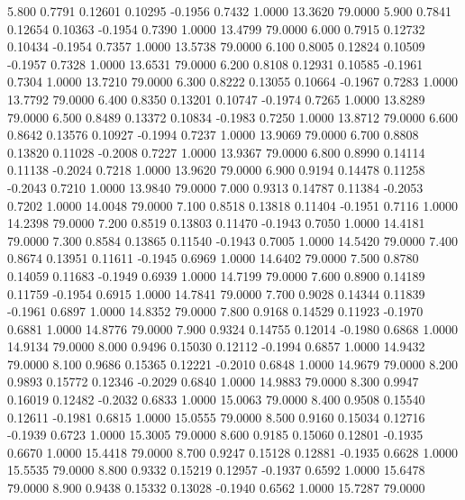    5.800   0.7791   0.12601   0.10295  -0.1956   0.7432   1.0000  13.3620  79.0000
   5.900   0.7841   0.12654   0.10363  -0.1954   0.7390   1.0000  13.4799  79.0000
   6.000   0.7915   0.12732   0.10434  -0.1954   0.7357   1.0000  13.5738  79.0000
   6.100   0.8005   0.12824   0.10509  -0.1957   0.7328   1.0000  13.6531  79.0000
   6.200   0.8108   0.12931   0.10585  -0.1961   0.7304   1.0000  13.7210  79.0000
   6.300   0.8222   0.13055   0.10664  -0.1967   0.7283   1.0000  13.7792  79.0000
   6.400   0.8350   0.13201   0.10747  -0.1974   0.7265   1.0000  13.8289  79.0000
   6.500   0.8489   0.13372   0.10834  -0.1983   0.7250   1.0000  13.8712  79.0000
   6.600   0.8642   0.13576   0.10927  -0.1994   0.7237   1.0000  13.9069  79.0000
   6.700   0.8808   0.13820   0.11028  -0.2008   0.7227   1.0000  13.9367  79.0000
   6.800   0.8990   0.14114   0.11138  -0.2024   0.7218   1.0000  13.9620  79.0000
   6.900   0.9194   0.14478   0.11258  -0.2043   0.7210   1.0000  13.9840  79.0000
   7.000   0.9313   0.14787   0.11384  -0.2053   0.7202   1.0000  14.0048  79.0000
   7.100   0.8518   0.13818   0.11404  -0.1951   0.7116   1.0000  14.2398  79.0000
   7.200   0.8519   0.13803   0.11470  -0.1943   0.7050   1.0000  14.4181  79.0000
   7.300   0.8584   0.13865   0.11540  -0.1943   0.7005   1.0000  14.5420  79.0000
   7.400   0.8674   0.13951   0.11611  -0.1945   0.6969   1.0000  14.6402  79.0000
   7.500   0.8780   0.14059   0.11683  -0.1949   0.6939   1.0000  14.7199  79.0000
   7.600   0.8900   0.14189   0.11759  -0.1954   0.6915   1.0000  14.7841  79.0000
   7.700   0.9028   0.14344   0.11839  -0.1961   0.6897   1.0000  14.8352  79.0000
   7.800   0.9168   0.14529   0.11923  -0.1970   0.6881   1.0000  14.8776  79.0000
   7.900   0.9324   0.14755   0.12014  -0.1980   0.6868   1.0000  14.9134  79.0000
   8.000   0.9496   0.15030   0.12112  -0.1994   0.6857   1.0000  14.9432  79.0000
   8.100   0.9686   0.15365   0.12221  -0.2010   0.6848   1.0000  14.9679  79.0000
   8.200   0.9893   0.15772   0.12346  -0.2029   0.6840   1.0000  14.9883  79.0000
   8.300   0.9947   0.16019   0.12482  -0.2032   0.6833   1.0000  15.0063  79.0000
   8.400   0.9508   0.15540   0.12611  -0.1981   0.6815   1.0000  15.0555  79.0000
   8.500   0.9160   0.15034   0.12716  -0.1939   0.6723   1.0000  15.3005  79.0000
   8.600   0.9185   0.15060   0.12801  -0.1935   0.6670   1.0000  15.4418  79.0000
   8.700   0.9247   0.15128   0.12881  -0.1935   0.6628   1.0000  15.5535  79.0000
   8.800   0.9332   0.15219   0.12957  -0.1937   0.6592   1.0000  15.6478  79.0000
   8.900   0.9438   0.15332   0.13028  -0.1940   0.6562   1.0000  15.7287  79.0000
